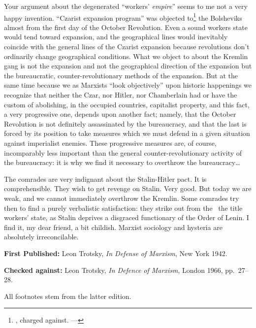 Your argument about the degenerated “workers’ \emph{empire}” seems to me not a very happy invention. “Czarist expansion program” was objected to\footnote{\ie, charged against. ---\ed} the Bolsheviks almost from the first day of the October Revolution. Even a sound workers state would tend toward expansion, and the geographical lines would inevitably coincide with the general lines of the Czarist expansion because revolutions don’t ordinarily change geographical conditions. What we object to about the Kremlin gang is not the expansion and not the geographical direction of the expansion but the bureaucratic, counter-revolutionary methods of the expansion. But at the same time because we as Marxists “look objectively” upon historic happenings we recognize that neither the Czar, nor Hitler, nor Chamberlain had or have the custom of abolishing, in the occupied countries, capitalist property, and this fact, a very progressive one, depends upon another fact; namely, that the October Revolution is not definitely assassinated by the bureaucracy, and that the last is forced by its position to take measures which we must defend in a given situation against imperialist enemies. These progressive measures are, of course, incomparably less important than the general counter-revolutionary activity of the bureaucracy: it is why we find it necessary to overthrow the bureaucracy\dots

The comrades are very indignant about the Stalin-Hitler pact. It is comprehensible. They wish to get revenge on Stalin. Very good. But today we are weak, and we cannot immediately overthrow the Kremlin. Some comrades try then to find a purely verbalistic satisfaction: they strike out from the \USSR\ the title workers’ state, as Stalin deprives a disgraced functionary of the Order of Lenin. I find it, my dear friend, a bit childish. Marxist sociology and hysteria are absolutely irreconcilable.


\begin{letterinfo}
	\textbf{First Published:} Leon Trotsky, \emph{In Defense of Marxism}, New York 1942.
	
	\textbf{Checked against:} Leon Trotsky, \emph{In Defence of Marxism}, London 1966, pp.~27--28.
	
	All footnotes stem from the latter edition.
\end{letterinfo}
